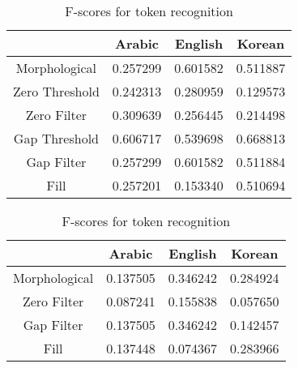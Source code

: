 \begin{table}
	\parbox{1\linewidth}{
		\centering
		\begin{tabular}{ | c | c | c | c |}
			\cline{2-4}
			\multicolumn{1}{c|}{} & Arabic & English & Korean \\ \hline
			Morphological & 0.257299 & 0.601582 & 0.511887 \\ \hline \hline
			Zero Threshold & 0.242313 & 0.280959 & 0.129573 \\ \hline
			Zero Filter & 0.309639 & 0.256445 & 0.214498 \\\hline \hline
			Gap Threshold & 0.606717 & 0.539698 & 0.668813 \\ \hline
			Gap Filter & 0.257299 & 0.601582 & 0.511884 \\ \hline \hline
			Fill & 0.257201 & 0.153340 & 0.510694 \\ \hline
		\end{tabular}
		\caption{F-scores for boundary recognition}
		\label{bsumtable}
	}

	\parbox{1\linewidth}{
		\centering
		\begin{tabular}{ | c | c | c | c |}
			\cline{2-4}
			\multicolumn{1}{c|}{} & Arabic & English & Korean \\ \hline
			Morphological & 0.137505 & 0.346242 & 0.284924 \\ \hline
			Zero Filter & 0.087241 & 0.155838 & 0.057650 \\ \hline
			Gap Filter & 0.137505 & 0.346242 & 0.142457 \\ \hline
			Fill & 0.137448 & 0.074367 & 0.283966 \\ \hline
		\end{tabular}
		\caption{F-scores for token recognition}
		\label{tsumtable}
	}
\end{table}
\FloatBarrier


